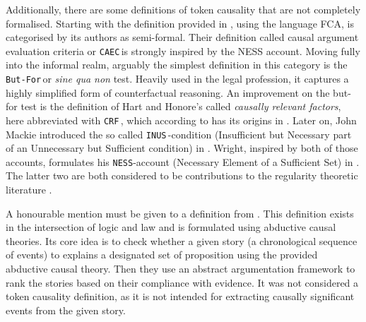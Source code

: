 \documentclass[11pt,a4paper]{book}
\theoremstyle{definition}
\theoremstyle{definition}
\theoremstyle{definition}
\theoremstyle{remark}
\newcommand{\butfor}{\texttt{But-For}\,}
\newcommand{\crf}{\texttt{CRF}\,}
\newcommand{\inus}{\texttt{INUS}\,}
\newcommand{\caec}{\texttt{CAEC}\,}
\begin{document}
Additionally, there are some definitions of token causality that are not completely formalised.  
Starting with the definition provided in \parencite{liepicna2019evaluation}, using the language FCA, is categorised by its authors as semi-formal. Their definition called causal argument evaluation criteria or \caec is strongly inspired by the NESS account.
Moving fully into the informal realm, arguably the simplest definition in this category is the \butfor or \emph{sine qua non} test. Heavily used in the legal profession, it captures a highly simplified form of counterfactual reasoning.
An improvement on the but-for test is the definition of Hart and Honore's called \emph{causally relevant factors}, here abbreviated with \crf, which according to \parencite{wright2017ness} has its origins in \parencite{hart1985causation}. 
Later on, John Mackie introduced the so called \inus-condition (Insufficient but Necessary part of an Unnecessary but Sufficient condition) in \parencite{mackie1965causes}. 
Wright, inspired by both of those accounts, formulates his \texttt{NESS}-account (Necessary Element of a Sufficient Set) in \parencite{wright1987causation}.
The latter two are both considered to be contributions to the regularity theoretic literature \parencite{baumgartner2013regularity}.

A honourable mention must be given to a definition from \parencite{bex2010hybrid}. This definition exists in the intersection of logic and law and is formulated using abductive causal theories. Its core idea is to check whether a given story (a chronological sequence of events) to explains a designated set of proposition using the provided abductive causal theory. Then they use an abstract argumentation framework to rank the stories based on their compliance with evidence. It was not considered a token causality definition, as it is not intended for extracting causally significant events from the given story.
\end{document}
